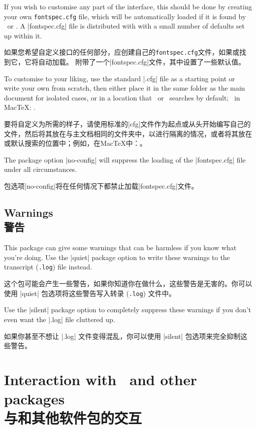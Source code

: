 \documentclass[a4paper]{l3doc}
\begin{document}
If you wish to customise any part of the
 interface, this should be done by creating your own
\texttt{fontspec.cfg} file,
which will be automatically loaded if it is found by \XeTeX\ or \LuaTeX.
A |fontspec.cfg| file is distributed with  with a small number of defaults set up within it.

如果您希望自定义接口的任何部分，应创建自己的\texttt{fontspec.cfg}文件，如果\XeTeX 或\LuaTeX 找到它，它将自动加载。
附带了一个|fontspec.cfg|文件，其中设置了一些默认值。

To customise  to your liking, use the standard |.cfg| file as a starting point or write your own from scratch, then either place it in the same folder as the main document for isolated cases, or in a location
that \XeTeX\ or \LuaTeX\ searches by default; \eg\ in Mac\TeX: .

要将自定义为所需的样子，请使用标准的|cfg|文件作为起点或从头开始编写自己的文件，然后将其放在与主文档相同的文件夹中，以进行隔离的情况，或者将其放在\XeTeX 或\LuaTeX 默认搜索的位置中；例如，在Mac\TeX 中：。

The package option |no-config| will suppress the loading of the |fontspec.cfg| file under all circumstances.

包选项|no-config|将在任何情况下都禁止加载|fontspec.cfg|文件。

\subsection{Warnings\\警告}
\label{sec:quiet-warnings}

This package can give some warnings that can be harmless if you know what
you're doing. Use the |quiet| package option to write these warnings to the
transcript (\texttt{.log}) file instead.

这个包可能会产生一些警告，如果你知道你在做什么，这些警告是无害的。你可以使用 |quiet| 包选项将这些警告写入转录 (\texttt{.log}) 文件中。

Use the |silent| package option to completely suppress these warnings if you
don't even want the |.log| file cluttered up.

如果你甚至不想让 |.log| 文件变得混乱，你可以使用 |silent| 包选项来完全抑制这些警告。

\section{Interaction with \LaTeXe\ and other packages\\与\LaTeXe 和其他软件包的交互}
\end{document}
